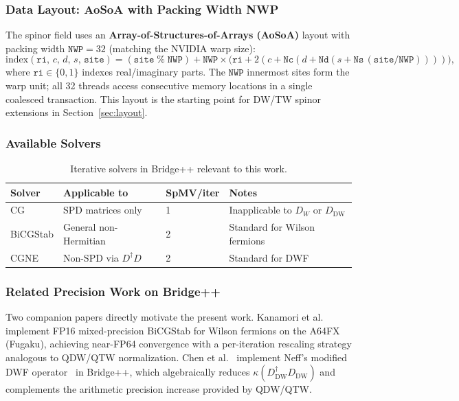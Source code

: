 \documentclass[12pt,a4paper]{article}
\newcommand{\NWP}{\mathtt{NWP}}
\newcommand{\Nc}{\mathtt{Nc}}
\newcommand{\Nd}{\mathtt{Nd}}
\newcommand{\Ns}{\mathtt{Ns}}
\begin{document}
\subsubsection{Data Layout: AoSoA with Packing Width NWP}

The spinor field uses an \textbf{Array-of-Structures-of-Arrays (AoSoA)} layout
with packing width $\NWP = 32$ (matching the NVIDIA warp size):
\begin{equation}
  \mathrm{index}(\mathtt{ri},\, c,\, d,\, s,\, \mathtt{site})
  = (\mathtt{site}\;\%\;\NWP)
  + \NWP \times
  \bigl(\mathtt{ri} + 2(c + \Nc(d + \Nd(s + \Ns\,(\mathtt{site}/\NWP))))\bigr),
  \label{eq:bridge_index}
\end{equation}
where $\mathtt{ri} \in \{0,1\}$ indexes real/imaginary parts.
The $\NWP$ innermost sites form the warp unit; all 32 threads access
consecutive memory locations in a single coalesced transaction.
This layout is the starting point for DW/TW spinor extensions
in Section~\ref{sec:layout}.

\subsubsection{Available Solvers}

\begin{table}[H]
\centering
\caption{Iterative solvers in Bridge++ relevant to this work.}
\begin{tabular}{llll}
\toprule
\textbf{Solver} & \textbf{Applicable to} & \textbf{SpMV/iter} & \textbf{Notes} \\
\midrule
CG              & SPD matrices only       & 1  & Inapplicable to $D_W$ or $D_{\mathrm{DW}}$ \\
BiCGStab        & General non-Hermitian   & 2  & Standard for Wilson fermions \\
CGNE            & Non-SPD via $D^\dagger D$ & 2  & Standard for DWF \\
\bottomrule
\end{tabular}
\end{table}

\subsubsection{Related Precision Work on Bridge++}

Two companion papers directly motivate the present work.
Kanamori et al.~\cite{Kanamori2026} implement FP16 mixed-precision BiCGStab
for Wilson fermions on the A64FX (Fugaku), achieving near-FP64 convergence
with a per-iteration rescaling strategy analogous to QDW/QTW normalization.
Chen et al.~\cite{Chen2026} implement Neff's modified DWF operator~\cite{Neff2015}
in Bridge++, which algebraically reduces $\kappa(D_{\mathrm{DW}}^\dagger D_{\mathrm{DW}})$
and complements the arithmetic precision increase provided by QDW/QTW.
\end{document}
